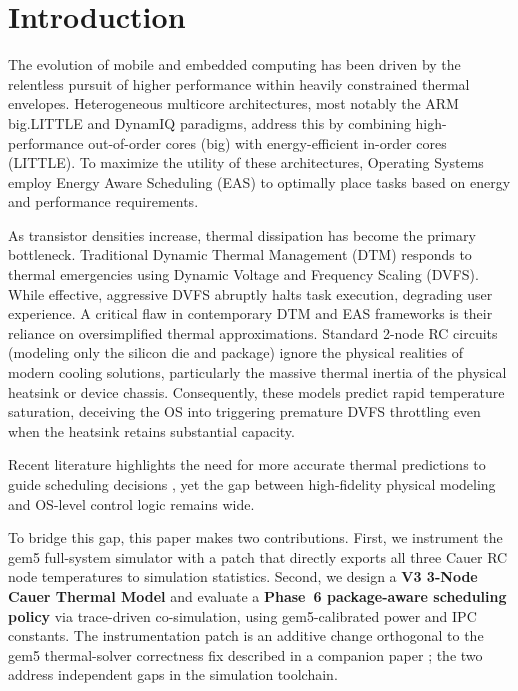 \section{Introduction}
\label{sec:intro}

The evolution of mobile and embedded computing has been driven by the relentless pursuit of higher performance within heavily constrained thermal envelopes. Heterogeneous multicore architectures, most notably the ARM big.LITTLE and DynamIQ paradigms, address this by combining high-performance out-of-order cores (big) with energy-efficient in-order cores (LITTLE). To maximize the utility of these architectures, Operating Systems employ Energy Aware Scheduling (EAS) \cite{eas2015} to optimally place tasks based on energy and performance requirements.

As transistor densities increase, thermal dissipation has become the primary bottleneck. Traditional Dynamic Thermal Management (DTM) responds to thermal emergencies using Dynamic Voltage and Frequency Scaling (DVFS). While effective, aggressive DVFS abruptly halts task execution, degrading user experience. A critical flaw in contemporary DTM and EAS frameworks is their reliance on oversimplified thermal approximations. Standard 2-node RC circuits (modeling only the silicon die and package) ignore the physical realities of modern cooling solutions, particularly the massive thermal inertia of the physical heatsink or device chassis. Consequently, these models predict rapid temperature saturation, deceiving the OS into triggering premature DVFS throttling even when the heatsink retains substantial capacity.

Recent literature highlights the need for more accurate thermal predictions to guide scheduling decisions \cite{podtas2025, dtm_retrospective}, yet the gap between high-fidelity physical modeling and OS-level control logic remains wide.

To bridge this gap, this paper makes two contributions. First, we instrument the gem5 full-system simulator with a patch that directly exports all three Cauer RC node temperatures to simulation statistics. Second, we design a \textbf{V3 3-Node Cauer Thermal Model} and evaluate a \textbf{Phase~6 package-aware scheduling policy} via trace-driven co-simulation, using gem5-calibrated power and IPC constants. The instrumentation patch is an additive change orthogonal to the gem5 thermal-solver correctness fix described in a companion paper \cite{self_paper1}; the two address independent gaps in the simulation toolchain.


